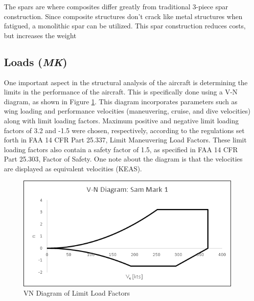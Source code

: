 The spars are where composites differ greatly from traditional 3-piece spar construction. Since composite structures don't crack like metal structures when fatigued, a monolithic spar can be utilized. This spar construction reduces costs, but increases the weight 


\subsection{Loads (\textit{MK})}
One important aspect in the structural analysis of the aircraft is determining the limits in the performance of the aircraft. This is specifically done using a V-N diagram, as shown in Figure \ref{figVN}. This diagram incorporates parameters such as wing loading and performance velocities (maneuvering, cruise, and dive velocities) along with limit loading factors. Maximum positive and negative limit loading factors of 3.2 and -1.5 were chosen, respectively, according to the regulations set forth in FAA 14 CFR Part 25.337, Limit Maneuvering Load Factors. These limit loading factors also contain a safety factor of 1.5, as specified in FAA 14 CFR Part 25.303, Factor of Safety. One note about the diagram is that the velocities are displayed as equivalent velocities (KEAS).

\begin{figure}[H]
    \centering
    \includegraphics{Photos/VN_Diagram_(2-11-20).png}
    \caption{VN Diagram of Limit Load Factors}
    \label{figVN}
\end{figure}
